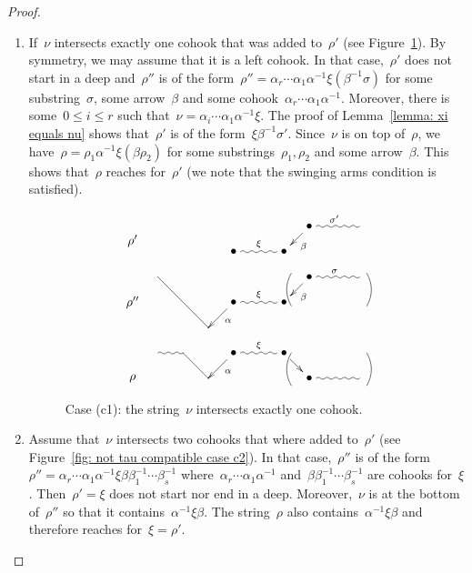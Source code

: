 \documentclass{memo-l}
\theoremstyle{definition}
\begin{document}
\begin{proof}
\begin{enumerate}[(a)]
\begin{enumerate}[(c1)]
\item If~$\nu$ intersects exactly one cohook that was added to~$\rho'$ (see Figure~\ref{fig: not tau compatible case c1}).
By symmetry, we may assume that it is a left cohook.
In that case,~$\rho'$ does not start in a deep and~$\rho''$ is of the form~$\rho''=\alpha_r\cdots\alpha_1\alpha^{-1}\xi(\beta^{-1}\sigma)$ for some substring~$\sigma$, some arrow~$\beta$ and some cohook~$\alpha_r\cdots\alpha_1\alpha^{-1}$.
Moreover, there is some~$0\leq i\leq r$ such that~$\nu=\alpha_i\cdots\alpha_1\alpha^{-1}\xi$.
The proof of Lemma~\ref{lemma: xi equals nu} shows that~$\rho'$ is of the form~$\xi\beta^{-1}\sigma'$.
Since~$\nu$ is on top of~$\rho$, we have~$\rho=\rho_1\alpha^{-1}\xi(\beta\rho_2)$ for some substrings~$\rho_1,\rho_2$ and some arrow~$\beta$.
This shows that~$\rho$ reaches for~$\rho'$ (we note that the swinging arms condition is satisfied).

\begin{figure}[h]
 	\capstart
\[
\xy
%
(-35,7)*+{\rho''};
(-28,14)="peak";
(-14,0)="-12";
(-7,7)*+{\bullet}="-11";
(7,7)*+{\bullet}="11";
(14,14)*+{\bullet}="12";
(28,14)="14";
%
(-35,-14)*+{\rho};
(-28,-7)="-4";
(-21,-7)="-3";
(-14,-14)="-2";
(-7,-7)*+{\bullet}="-1";
(7,-7)*+{\bullet}="1";
(14,-14)*+{\bullet}="2";
(28,-14)="4";
%
{\ar@{-} "peak";"-12"};
{\ar^{\alpha} "-11";"-12"};
{\ar@{~}^\xi "-11";"11"};
{\ar^{\beta} "12";"11"};
{\ar@{~}^\sigma "12";"14"};
%
{\ar@/^.3pc/@{-} (30,15);(30,6)};
{\ar@/_.3pc/@{-} (9,15);(9,6)};
%
{\ar@/_.3pc/@{-} (30,-16);(30,-7)};
{\ar@/^.3pc/@{-} (9,-16);(9,-7)};
%
{\ar@{~} "-4";"-3"};
{\ar@{-} "-3";"-2"};
{\ar^{\alpha} "-1";"-2"};
{\ar@{~}^\xi "-1";"1"};
{\ar "1";"2"};
{\ar@{~} "2";"4"};
%
%
%
(-35,24)*+{\rho'};
(-7,21)*+{\bullet}="-21";
(7,21)*+{\bullet}="21";
(14,28)*+{\bullet}="22";
(28,28)="24";
%
{\ar@{~}^\xi "-21";"21"};
{\ar^{\beta} "22";"21"};
{\ar@{~}^{\sigma'} "22";"24"};
%
\endxy
\]
    \caption{Case (c1): the string~$\nu$ intersects exactly one cohook.}
    \vspace{-.5cm}
    \label{fig: not tau compatible case c1}
\end{figure}

\item Assume that~$\nu$ intersects two cohooks that where added to~$\rho'$ (see Figure~\ref{fig: not tau compatible case c2}).
In that case,~$\rho''$ is of the form~$\rho''=\alpha_r\cdots\alpha_1\alpha^{-1}\xi\beta\beta_1^{-1}\cdots\beta_s^{-1}$ where~$\alpha_r\cdots\alpha_1\alpha^{-1}$ and~$\beta\beta_1^{-1}\cdots\beta_s^{-1}$ are cohooks for~$\xi$.
Then~$\rho'=\xi$ does not start nor end in a deep.
Moreover,~$\nu$ is at the bottom of~$\rho''$ so that it contains~$\alpha^{-1}\xi\beta$.
The string~$\rho$ also contains~$\alpha^{-1}\xi\beta$ and therefore reaches for~$\xi=\rho'$.


\end{enumerate}
\end{enumerate}
\end{proof}
\end{document}
